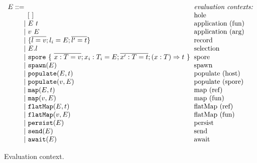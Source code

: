 \begin{figure}
\centering
 $\ba[t]{l@{\hspace{2mm}}l}
E ::=                                                                                                     & \mbox{\it{evaluation contexts:}} \\
\gap \:\:\:\: [~]                                                                                         & \mbox{hole} \\
\gap ~|~  E~t                                                                                             & \mbox{application (fun)} \\
\gap ~|~  v~E                                                                                             & \mbox{application (arg)} \\
\gap ~|~  \{ \seq{l = v} ; l_i = E ; \seq{l' = t} \}                                                      & \mbox{record} \\
\gap ~|~  E.l                                                                                             & \mbox{selection} \\
\gap ~|~  \texttt{spore}~\{~\seq{x : T = v} ; x_i : T_i = E ; \seq{x' : T = t} ; (x: T) \Rightarrow t~\}  & \mbox{spore} \\
\gap ~|~  \texttt{spawn}(E)                                                                               & \mbox{spawn} \\
\gap ~|~  \texttt{populate}(E, t)                                                                         & \mbox{populate (host)} \\
\gap ~|~  \texttt{populate}(v, E)                                                                         & \mbox{populate (spore)} \\
\gap ~|~  \texttt{map}(E, t)                                                                              & \mbox{map (ref)} \\
\gap ~|~  \texttt{map}(v, E)                                                                              & \mbox{map (fun)} \\
\gap ~|~  \texttt{flatMap}(E, t)                                                                          & \mbox{flatMap (ref)} \\
\gap ~|~  \texttt{flatMap}(v, E)                                                                          & \mbox{flatMap (fun)} \\
\gap ~|~  \texttt{persist}(E)                                                                             & \mbox{persist} \\
\gap ~|~  \texttt{send}(E)                                                                                & \mbox{send} \\
\gap ~|~  \texttt{await}(E)                                                                               & \mbox{await} \\
\ea$
\caption{Evaluation context.}\label{fig:eval-ctx}
\end{figure}

